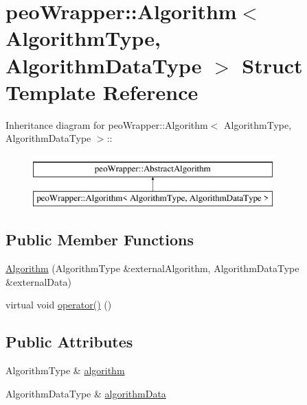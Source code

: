 \hypertarget{structpeoWrapper_1_1Algorithm}{
\section{peo\-Wrapper::Algorithm$<$ Algorithm\-Type, Algorithm\-Data\-Type $>$ Struct Template Reference}
\label{structpeoWrapper_1_1Algorithm}
}
Inheritance diagram for peo\-Wrapper::Algorithm$<$ Algorithm\-Type, Algorithm\-Data\-Type $>$::\begin{figure}[H]
\begin{center}
\leavevmode
\includegraphics[height=2cm]{structpeoWrapper_1_1Algorithm}
\end{center}
\end{figure}
\subsection*{Public Member Functions}
\begin{CompactItemize}
\item 
\hypertarget{structpeoWrapper_1_1Algorithm_6b615c46939bba8ff8d1c7f35b5d47b8}{
\hyperlink{structpeoWrapper_1_1Algorithm_6b615c46939bba8ff8d1c7f35b5d47b8}{Algorithm} (Algorithm\-Type \&external\-Algorithm, Algorithm\-Data\-Type \&external\-Data)}
\label{structpeoWrapper_1_1Algorithm_6b615c46939bba8ff8d1c7f35b5d47b8}

\item 
\hypertarget{structpeoWrapper_1_1Algorithm_8db189b4456bcf056b327ecbf000de7b}{
virtual void \hyperlink{structpeoWrapper_1_1Algorithm_8db189b4456bcf056b327ecbf000de7b}{operator()} ()}
\label{structpeoWrapper_1_1Algorithm_8db189b4456bcf056b327ecbf000de7b}

\end{CompactItemize}
\subsection*{Public Attributes}
\begin{CompactItemize}
\item 
\hypertarget{structpeoWrapper_1_1Algorithm_eb826079a4c774ade1e933acbdd401c2}{
Algorithm\-Type \& \hyperlink{structpeoWrapper_1_1Algorithm_eb826079a4c774ade1e933acbdd401c2}{algorithm}}
\label{structpeoWrapper_1_1Algorithm_eb826079a4c774ade1e933acbdd401c2}

\item 
\hypertarget{structpeoWrapper_1_1Algorithm_2c9f577fe7519df7fda1f2afd08b7c91}{
Algorithm\-Data\-Type \& \hyperlink{structpeoWrapper_1_1Algorithm_2c9f577fe7519df7fda1f2afd08b7c91}{algorithm\-Data}}
\label{structpeoWrapper_1_1Algorithm_2c9f577fe7519df7fda1f2afd08b7c91}

\end{CompactItemize}


